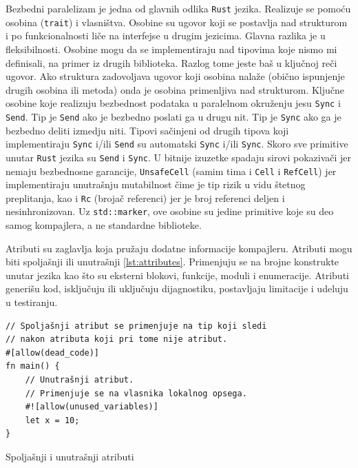 \documentclass[11pt]{article}
\begin{document}
Bezbedni paralelizam je jedna od glavnih odlika \verb|Rust| jezika. Realizuje se pomoću osobina (\verb|trait|)
i vlasništva. Osobine su ugovor koji se postavlja nad strukturom i po funkcionalnosti liče na interfejse
u drugim jezicima. Glavna razlika je u fleksibilnosti. Osobine mogu da se implementiraju nad tipovima
koje nismo mi definisali, na primer iz drugih biblioteka. Razlog tome jeste baš u ključnoj reči ugovor.
Ako struktura zadovoljava ugovor koji osobina nalaže (obično ispunjenje drugih osobina ili
metoda) onda je osobina primenljiva nad strukturom. Ključne osobine koje realizuju bezbednost podataka
u paralelnom okruženju jesu \verb|Sync| i \verb|Send|. Tip je \verb|Send| ako je bezbedno poslati ga 
u drugu nit. Tip je \verb|Sync| ako ga je bezbedno deliti izmedju niti. Tipovi sačinjeni od drugih tipova koji
implementiraju \verb|Sync| i/ili \verb|Send| su automatski \verb|Sync| i/ili \verb|Sync|. Skoro sve primitive
unutar \verb|Rust| jezika su \verb|Send| i \verb|Sync|. U bitnije izuzetke spadaju sirovi pokazivači jer nemaju
bezbednosne garancije, \verb|UnsafeCell| (samim tima i \verb|Cell| i \verb|RefCell|) jer implementiraju
unutrašnju mutabilnost čime je tip rizik u vidu štetnog preplitanja, kao i \verb|Rc| (brojač referenci) 
jer je broj referenci deljen i nesinhronizovan. Uz \verb|std::marker|, ove osobine su jedine primitive koje su 
deo samog kompajlera, a ne standardne biblioteke.

Atributi su zaglavlja koja pružaju dodatne informacije kompajleru. Atributi mogu biti spoljašnji ili 
unutrašnji \ref{lst:attributes}. Primenjuju se na brojne konstrukte unutar jezika kao što su eksterni blokovi,
funkcije, moduli i enumeracije. Atributi generišu kod, isključuju ili uključuju dijagnostiku, 
postavljaju limitacije i udeluju u testiranju. 

\begin{listing}[H]
\begin{verbatim}
// Spoljašnji atribut se primenjuje na tip koji sledi 
// nakon atributa koji pri tome nije atribut.
#[allow(dead_code)] 
fn main() {
    // Unutrašnji atribut.
    // Primenjuje se na vlasnika lokalnog opsega. 
    #![allow(unused_variables)]
    let x = 10;  
}
\end{verbatim}
\caption{Spoljašnji i unutrašnji atributi}
\label{lst:attributes}
\end{listing}
\end{document}
